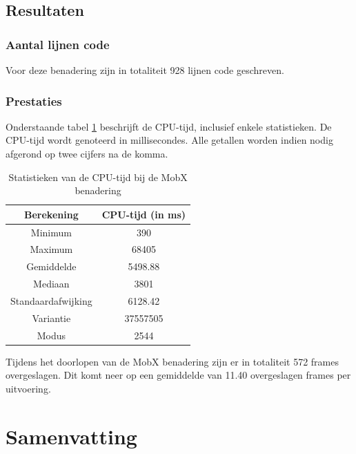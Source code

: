 \subsection{Resultaten}
\subsubsection{Aantal lijnen code}
Voor deze benadering zijn in totaliteit 928 lijnen code geschreven.
\subsubsection{Prestaties}
Onderstaande tabel \ref{table:experiment-mobx-statistics} beschrijft de CPU-tijd, inclusief enkele statistieken. De CPU-tijd wordt genoteerd in millisecondes. Alle getallen worden indien nodig afgerond op twee cijfers na de komma.
\begin{table}[H]
    \centering
    \begin{tabular}{c|c}
        \textbf{Berekening} & \textbf{CPU-tijd (in ms)} \\ \hline
        Minimum             & 390                       \\ \hline
        Maximum             & 68405                     \\ \hline
        Gemiddelde          & 5498.88                   \\ \hline
        Mediaan             & 3801                      \\ \hline
        Standaardafwijking  & 6128.42                   \\ \hline
        Variantie           & 37557505                  \\ \hline
        Modus               & 2544                      \\                
    \end{tabular}
    \caption{Statistieken van de CPU-tijd bij de MobX benadering}
    \label{table:experiment-mobx-statistics}
\end{table}

Tijdens het doorlopen van de MobX benadering zijn er in totaliteit 572 frames overgeslagen. Dit komt neer op een gemiddelde van 11.40 overgeslagen frames per uitvoering.

\section{Samenvatting}

